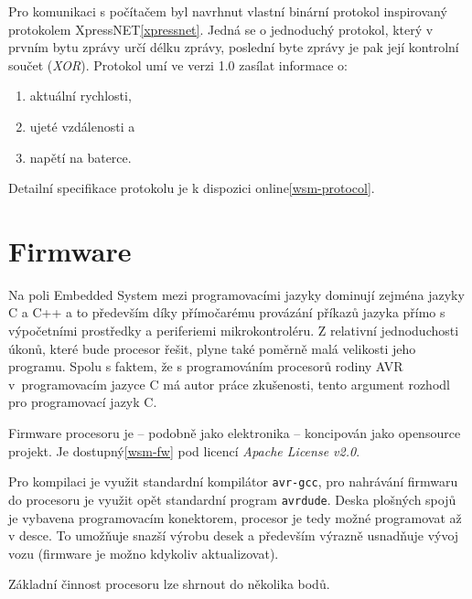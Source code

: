 Pro komunikaci s počítačem byl navrhnut vlastní binární protokol inspirovaný
protokolem XpressNET\ref{xpressnet}. Jedná se o jednoduchý protokol, který
v prvním bytu zprávy určí délku zprávy, poslední byte zprávy je pak její
kontrolní součet (\textit{XOR}). Protokol umí ve verzi 1.0 zasílat informace o:

\begin{enumerate}
\item aktuální rychlosti,
\item ujeté vzdálenosti a
\item napětí na baterce.
\end{enumerate}

Detailní specifikace protokolu je k dispozici online\ref{wsm-protocol}.

\section{Firmware}

Na poli Embedded System mezi programovacími jazyky dominují zejména jazyky
C a C++ a to především díky přímočarému provázání příkazů jazyka přímo s
výpočetními prostředky a periferiemi mikrokontroléru. Z relativní jednoduchosti
úkonů, které bude procesor řešit, plyne také poměrně malá velikosti jeho
programu. Spolu s faktem, že s programováním procesorů rodiny AVR
v~programovacím jazyce C má autor práce zkušenosti, tento argument rozhodl pro
programovací jazyk C.

Firmware procesoru je -- podobně jako elektronika -- koncipován jako opensource
projekt. Je dostupný\ref{wsm-fw} pod licencí \textit{Apache License v2.0}.

Pro kompilaci je využit standardní kompilátor \texttt{avr-gcc}, pro nahrávání
firmwaru do procesoru je využit opět standardní program \texttt{avrdude}. Deska
plošných spojů je vybavena programovacím konektorem, procesor je tedy možné
programovat až v desce. To umožňuje snazší výrobu desek a především výrazně
usnadňuje vývoj vozu (firmware je možno kdykoliv aktualizovat).

Základní činnost procesoru lze shrnout do několika bodů.

